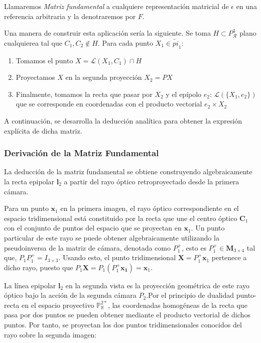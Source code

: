 \documentclass[
10pt, %
a4paper, %
oneside, %
headinclude,footinclude, %
BCOR=5mm, %
]{scrartcl}
\begin{document}
\begin{definition}
    Llamaremos \textit{Matriz fundamental} a cualquiere representación matricial de $\epsilon$ en una referencia arbitraria y la denotraremos por $F$.
\end{definition}

Una manera de construir esta aplicación sería la siguiente. Se toma $H \subset P^3_\mathcal{R}$ plano cualquierea tal que $C_1, C_2 \notin H$. Para cada punto $X_1 \in \tilde{pi}_1$:

\begin{enumerate}
    \item Tomamos el punto $X = \mathcal{L}(X_1, C_1) \cap H$
    \item Proyectamos $X$ en la segunda proyección $X_2 = PX$
    \item Finalmente, tomamos la recta que pasar por $X_2$ y el epípolo $e_2$: $\mathcal{L}(\{X_1, e_2\})$ que se corresponde en coordenadas con el producto vectorial $e_2 \times X_2$
\end{enumerate}

A continuación, se desarrolla la deducción analítica para obtener la expresión explícita de dicha matriz.

\subsubsection{Derivación de la Matriz Fundamental}

La deducción de la matriz fundamental se obtiene construyendo algebraicamente la recta epipolar $\mathbf{l}_2$ a partir del rayo óptico retroproyectado desde la primera cámara.

Para un punto $\mathbf{x}_1$ en la primera imagen, el rayo óptico correspondiente en el espacio tridimensional está constituido por la recta que une el centro óptico $\mathbf{C}_1$ con el conjunto de puntos del espacio que se proyectan en $\mathbf{x}_1$. Un punto particular de este rayo se puede obtener algebraicamente utilizando la pseudoinversa de la matriz de cámara, denotada como $P_1^+$, esto es $P_1^+ \in \mathbf{M}_{3 \times 4}$ tal que, $P_1 P_1^+ = I_{3 \times 3}$. Usando esto, el punto tridimensional $\mathbf{X} = P_1^+ \mathbf{x}_1$ pertenece a dicho rayo, puesto que $P_1 \mathbf{X} = P_1 (P_1^+ \mathbf{x_1}) = \mathbf{x}_1$.

La línea epipolar $\mathbf{l}_2$ en la segunda vista es la proyección geométrica de este rayo óptico bajo la acción de la segunda cámara $P_2$.Por el principio de dualidad punto-recta en el espacio proyectivo $\mathbb{P}_\mathbb{R}^{2*}$, las coordenadas homogéneas de la recta que pasa por dos puntos se pueden obtener mediante el producto vectorial de dichos puntos. Por tanto, se proyectan los dos puntos tridimensionales conocidos del rayo sobre la segunda imagen:
\end{document}
